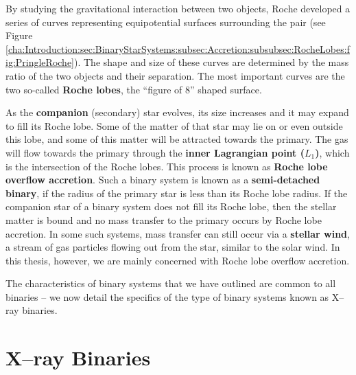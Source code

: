 By studying the gravitational interaction between two objects, Roche
developed a series of curves representing equipotential surfaces
surrounding the pair (see Figure~%
\vref{cha:Introduction:sec:BinaryStarSystems:subsec:Accretion:subsubsec:RocheLobes:fig:PringleRoche}). The shape and size of these curves are determined by the mass ratio of
the two objects and their separation.  The most important curves are
the two so-called \textbf{Roche lobes}, the ``figure of 8'' shaped surface. %

\vspace{\myparskip}

As the \textbf{companion} (secondary) star evolves, %
its size increases and it may expand to fill its Roche lobe. Some of
the matter of that star may lie on or even outside this lobe, and some of this matter will
be attracted towards the primary. The gas will flow towards the
primary through the \textbf{inner Lagrangian point ($L_1$)}, %
which is the intersection of the Roche lobes. This process is known as
\textbf{Roche lobe overflow accretion}. %
Such a binary system is known as a \textbf{semi-detached binary}, if the radius of the primary star is less than its Roche lobe
radius. If the companion star of a binary system does not fill its
Roche lobe, then the stellar matter is bound and no mass transfer to
the primary occurs by Roche lobe accretion. In some such systems, mass
transfer can still occur via a
\textbf{stellar wind}, a stream of gas particles flowing out from the star, similar to the
solar wind. In this thesis, however, we are mainly concerned with
Roche lobe overflow accretion. %

\vspace{\myparskip}

The characteristics of binary systems that we have outlined are common to all binaries -- we now detail the specifics of the type of binary systems known as X--ray binaries. %


\section{X--ray Binaries}\label{cha:Introduction:sec:X--rayBinaries}

